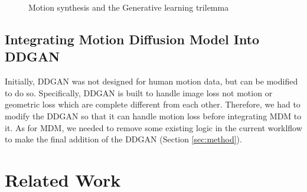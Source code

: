 \documentclass[10pt,twocolumn,letterpaper]{article}
\begin{document}
\begin{figure}[h!]    
    \centering
    \caption{Motion synthesis and the Generative learning trilemma \cite{Tevet23} \cite{Xiao22}}    
    \label{fig:intro-0}
\end{figure}

\subsection{Integrating Motion Diffusion Model Into DDGAN}

Initially, DDGAN was not designed for human motion data, but can be modified to do so. Specifically, DDGAN 
is built to handle image loss not motion or geometric loss which are complete different from each other. 
Therefore, we had to modify the DDGAN so that it can handle motion loss before integrating MDM to it. As for MDM, we needed to 
remove some existing logic in the current worklflow to make the final addition of the DDGAN (Section \ref{sec:method}). 

\section{Related Work}
\label{sec:related-work}
\end{document}
